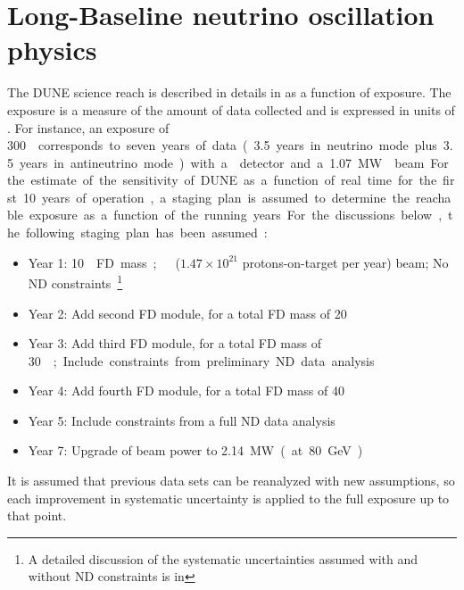 \section{Long-Baseline neutrino oscillation physics}

The DUNE science reach is described in details in \volphys as a
function of exposure.  The exposure is a measure of the amount of data
collected and is expressed in units of \ktMWyr{}. For instance, an
exposure of \SI{300}\ktMWyr{} corresponds to seven years of data
(\num{3.5} years in neutrino mode plus \num{3.5} years in antineutrino
mode) with a  detector and a \SI{1.07}\MW{} beam.

For the estimate of the sensitivity of DUNE as a function of real time
for the first \num{10} years of operation, a staging plan is assumed 
to determine the reachable
exposure as a function of the running years. For the discussions below,
the following staging plan has
been assumed:
\begin{itemize}
\item Year 1: \SI{10}\kt{} FD mass;   ($1.47 \times 10^{21}$ protons-on-target per year) beam; No ND
  constraints~\footnote{A detailed discussion of the systematic uncertainties assumed
 with and without ND constraints is in \volphys}
\item Year 2: Add second  FD module, for a total FD mass of
  \SI{20}\kt
\item Year 3: Add third  FD module, for a total FD mass of
  \SI{30}\kt; Include constraints from preliminary ND data analysis
\item Year 4: Add fourth  FD module, for a total FD mass of
  \SI{40}\kt
\item Year 5: Include constraints from a full ND data analysis 
 \item Year 7: Upgrade of beam power to \SI{2.14}\MW (at \SI{80}\GeV)
\end{itemize}
It is assumed that previous data sets can be reanalyzed with new
assumptions, so each improvement in systematic uncertainty is applied
to the full exposure up to that point.

